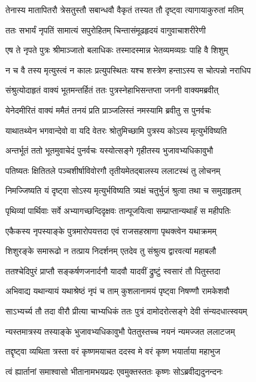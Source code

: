 \twolineshloka
{तेनास्य मातापितरौ त्रेसतुस्तौ सबान्धवौ}
{वैकृतं तस्यत तौ दृष्ट्वा त्यागायाकुरुतां मतिम्}


\twolineshloka
{ततः सभार्यं नृपतिं सामात्यं सपुरोहितम्}
{चिन्तासंमूढहृदयं वागुवाचाशरीरेणी}


\twolineshloka
{एष ते नृपते पुत्रः श्रीमाञ्जातो बलाधिकः}
{तस्मादस्मान्न भेतव्यमव्यग्रः पाहि वै शिशुम्}


\twolineshloka
{न च वै तस्य मृत्युस्त्वं न कालः प्रत्युपस्थितः}
{यश्च शस्त्रेण हन्ताऽस्य स चोत्पन्नो नराधिप}


\twolineshloka
{संश्रुत्योदाहृतं वाक्यं भूतमन्तर्हितं ततः}
{पुत्रस्नेहाभिसन्तप्ता जननी वाक्यमब्रवीत्}


\twolineshloka
{येनेदमीरितं वाक्यं ममैतं तनयं प्रति}
{प्राञ्जलिस्तं नमस्यामि ब्रवीतु स पुनर्वचः}


\twolineshloka
{याथातथ्येन भगवान्देवो वा यदि वेतरः}
{श्रोतुमिच्छामि पुत्रस्य कोऽस्य मृत्युर्भविष्यति}


\twolineshloka
{अन्तर्भूतं ततो भूतमुवाचेदं पुनर्वचः}
{यस्योत्सङ्गे गृहीतस्य भुजावभ्यधिकावुभौ}


\twolineshloka
{पतिष्यतः क्षितितले पञ्चशीर्षाविवोरगौ}
{तृतीयमेतद्बालस्य ललाटस्थं तु लोचनम्}


\twolineshloka
{निमज्जिष्यति यं दृष्ट्वा सोऽस्य मृत्युर्भविष्यति}
{त्र्यक्षं चतुर्भुजं श्रुत्वा तथा च समुदाहृतम्}


\twolineshloka
{पृथिव्यां पार्थिवाः सर्वे अभ्यागच्छन्दिदृक्षवः}
{तान्पूजयित्वा सम्प्राप्तान्यथार्हं स महीपतिः}


\twolineshloka
{एकैकस्य नृपस्याङ्के पुत्रमारोपयत्तदा}
{एवं राजसहस्राणा पृथक्त्वेन यथाक्रमम्}


\twolineshloka
{शिशुरङ्के समारूढो न तत्प्राय निदर्शनम्}
{एतदेव तु संश्रुत्य द्वारवत्यां महाबलौ}


\twolineshloka
{ततश्चेदिपुरं प्राप्तौ सङ्कर्षणजनार्दनौ}
{यादवौ यादवीं द्रुष्टुं स्वसारं तौ पितुस्तदा}


\twolineshloka
{अभिवाद्य यथान्यायं यथाश्रेष्ठं नृपं च ताम्}
{कुशलानामयं पृष्ट्वा निषण्णौ रामकेशवौ}


\twolineshloka
{साऽभ्यर्च्य तौ तदा वीरौ प्रीत्या चाभ्यधिकं ततः}
{पुत्रं दामोदरोत्सङ्गे देवी संन्यदधात्स्वयम्}


\twolineshloka
{न्यस्तमात्रस्य तस्याङ्के भुजावभ्यधिकावुभौ}
{पेततुस्तच्च नयनं न्यमज्जत ललाटजम्}


\twolineshloka
{तद्दृष्ट्वा व्यथिता त्रस्ता वरं कृष्णमयाचत}
{ददस्व मे वरं कृष्ण भयार्ताया महाभुज}


\twolineshloka
{त्वं ह्यार्तानां समाश्वासो भीतानामभयप्रदः}
{एवमुक्तस्ततः कृष्णः सोऽब्रवीद्यदुनन्दनः}


